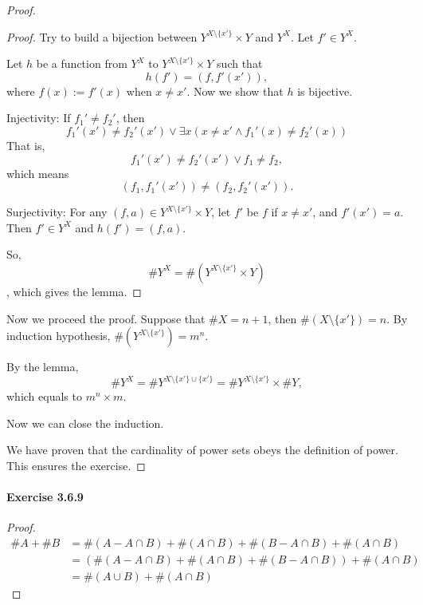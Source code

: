 \begin{proof}
\begin{proof}
Try to build a bijection between $Y^{X\setminus\{x'\}} \times Y$ and $Y^X$. Let $f' \in Y^X$.

Let $h$ be a function from $Y^X$ to $Y^{X\setminus\{x'\}} \times Y$ such that
\[
h(f') = (f,f'(x')), 
\]
where $f(x):=f'(x)$ when $x \neq x'$. Now we show that $h$ is bijective.

Injectivity: 
If ${f_1}' \neq {f_2}'$, then 
\[
{f_1}'(x') \neq {f_2}'(x') \vee \exists x(x \neq x' \wedge {f_1}'(x) \neq {f_2}'(x))
\]
That is, 
\[
{f_1}'(x') \neq {f_2}'(x') \vee f_1 \neq f_2,
\]
which means 
\[
(f_1,{f_1}'(x')) \neq (f_2,{f_2}'(x')).
\]

Surjectivity:
For any $(f,a) \in Y^{X\setminus\{x'\}} \times Y$, let $f'$ be $f$ if $x\neq x'$, and $f'(x') = a$. Then 
$f' \in Y^X$ and $h(f') = (f,a)$.

So, 
\[
\#Y^X = \#(Y^{X\setminus\{x'\}} \times Y)
\], which gives the lemma.
\end{proof}

Now we proceed the proof. Suppose that $\#X = n+1$, then $\#(X \setminus\{x'\}) = n$. By induction 
hypothesis, $\#(Y^{X \setminus\{x'\}}) = m^n$. 

By the lemma, 
\[
\#Y^X = \#Y^{X\setminus\{x'\}\cup\{x'\}} = \#Y^{X\setminus\{x'\}} \times \#Y,
\]
which equals to $m^n \times m$.

Now we can close the induction.

We have proven that the cardinality of power sets obeys the definition of power. This ensures the 
exercise.
\end{proof}

\paragraph{Exercise 3.6.9} \label{exercise3.6.9}
\begin{proof}
\begin{align*}
\#A + \#B 
&= \#(A - A \cap B) + \#(A \cap B) + \#(B - A \cap B) + \#(A \cap B) \\
&= (\#(A - A \cap B) + \#(A \cap B) + \#(B - A \cap B)) + \#(A \cap B) \\
&= \#(A \cup B) + \#(A \cap B)
\end{align*}
\end{proof}
